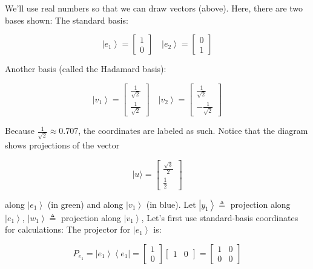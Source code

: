\documentclass[main.tex]{subfiles}
\begin{document}
    We'll use real numbers so that we can draw vectors (above). Here, there are two bases shown: The standard basis:
    
    $$
    \left|e_{1}\right\rangle=\left[\begin{array}{l}
    1 \\
    0
    \end{array}\right] \quad\left|e_{2}\right\rangle=\left[\begin{array}{l}
    0 \\
    1
    \end{array}\right]
    $$
    
    Another basis (called the Hadamard basis):
    
    $$
    \left|v_{1}\right\rangle=\left[\begin{array}{c}
    \frac{1}{\sqrt{2}} \\
    \frac{1}{\sqrt{2}}
    \end{array}\right] \quad\left|v_{2}\right\rangle=\left[\begin{array}{c}
    \frac{1}{\sqrt{2}} \\
    -\frac{1}{\sqrt{2}}
    \end{array}\right]
    $$
    
    Because $\frac{1}{\sqrt{2}} \approx 0.707$, the coordinates are labeled as such. Notice that the diagram shows projections of the vector
    
    $$
    |u\rangle=\left[\begin{array}{c}
    \frac{\sqrt{3}}{2} \\
    \frac{1}{2}
    \end{array}\right]
    $$
    
    along $\left|e_{1}\right\rangle$ (in green) and along $\left|v_{1}\right\rangle$ (in blue). Let $\left|y_{1}\right\rangle \triangleq$ projection along $\left|e_{1}\right\rangle$, $\left|w_{1}\right\rangle \triangleq$ projection along $\left|v_{1}\right\rangle$, Let's first use standard-basis coordinates for calculations: The projector for $\left|e_{1}\right\rangle$ is:
    
    $$
    P_{e_{1}}=\left|e_{1}\right\rangle\left\langle e_{1}\right|=\left[\begin{array}{l}
    1 \\
    0
    \end{array}\right]\left[\begin{array}{ll}
    1 & 0
    \end{array}\right]=\left[\begin{array}{ll}
    1 & 0 \\
    0 & 0
    \end{array}\right]
    $$
    
\end{document}
